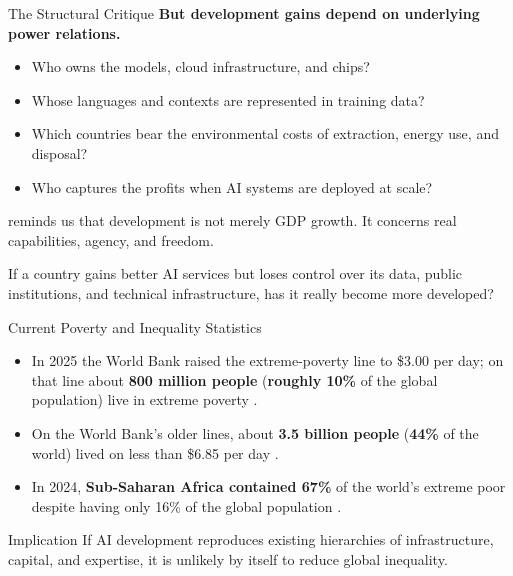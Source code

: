 \documentclass[aspectratio=169,11pt]{beamer}
\begin{document}
\begin{frame}{The Structural Critique}
\textbf{But development gains depend on underlying power relations.}

\vspace{0.2cm}
\begin{itemize}
    \item Who owns the models, cloud infrastructure, and chips?
    \item Whose languages and contexts are represented in training data?
    \item Which countries bear the environmental costs of extraction, energy use, and disposal?
    \item Who captures the profits when AI systems are deployed at scale?
\end{itemize}

\vspace{0.2cm}
\textcite{sen_development_freedom} reminds us that development is not merely GDP growth. It concerns real capabilities, agency, and freedom.

\vspace{0.2cm}
\begin{discussionbox}
\scriptsize
If a country gains better AI services but loses control over its data, public institutions, and technical infrastructure, has it really become more developed?
\end{discussionbox}
\end{frame}

\begin{frame}{Current Poverty and Inequality Statistics}
\begin{itemize}
    \item In 2025 the World Bank raised the extreme-poverty line to \$3.00 per day; on that line about \textbf{800 million people} (\textbf{roughly 10\%} of the global population) live in extreme poverty \parencite{worldbank_poverty_update_2025}.
    \item On the World Bank's older lines, about \textbf{3.5 billion people} (\textbf{44\%} of the world) lived on less than \$6.85 per day \parencite{worldbank_poverty_planet_2024}.
    \item In 2024, \textbf{Sub-Saharan Africa contained 67\%} of the world's extreme poor despite having only 16\% of the global population \parencite{worldbank_poverty_planet_2024}.
\end{itemize}

\begin{alertblock}{Implication}
If AI development reproduces existing hierarchies of infrastructure, capital, and expertise, it is unlikely by itself to reduce global inequality.
\end{alertblock}
\end{frame}
\end{document}

